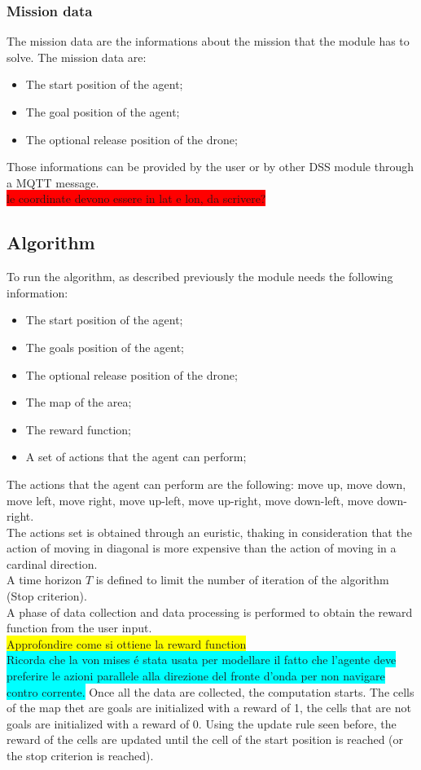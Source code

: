 \documentclass[journal,article,submit,pdftex,moreauthors]{Definitions/mdpi}
\begin{document}
\subsubsection{Mission data}
The mission data are the informations about the mission that the module has to solve. The mission data are:
\begin{itemize}
	\item The start position of the agent;
	\item The goal position of the agent;
	\item The optional release position of the drone;
\end{itemize}
Those informations can be provided by the user or by other DSS module through a MQTT message.\\
\colorbox{red}{le coordinate devono essere in lat e lon, da scrivere?}

\subsection{Algorithm}
To run the algorithm, as described previously the module needs the following information:
\begin{itemize}
	\item The start position of the agent;
	\item The goals position of the agent;
	\item The optional release position of the drone;
	\item The map of the area;
	\item The reward function;
	\item A set of actions that the agent can perform;
\end{itemize}

The actions that the agent can perform are the following: {move up, move down, move left, move right, move up-left, move up-right, move down-left, move down-right}.\\
The actions set is obtained through an euristic, thaking in consideration that the action of moving in diagonal is more expensive than the action of moving in a cardinal direction.\\
A time horizon $T$ is defined to limit the number of iteration of the algorithm (Stop criterion).\\
A phase of data collection and data processing is performed to obtain the reward function from the user input.\\
\colorbox{yellow}{Approfondire come si ottiene la reward function}\\
\colorbox{cyan}{Ricorda che la von mises é stata usata per modellare il fatto che l'agente deve preferire le azioni parallele alla direzione del fronte d'onda per non navigare contro corrente.}
Once all the data are collected, the computation starts. The cells of the map thet are goals are initialized with a reward of 1, the cells that are not goals are initialized with a reward of 0.
Using the update rule seen before, the reward of the cells are updated until the cell of the start position is reached (or the stop criterion is reached).\\
\end{document}
